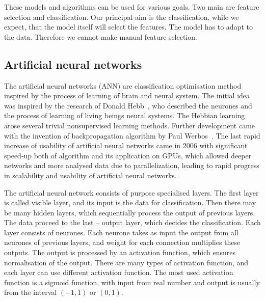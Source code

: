 \documentclass[
  print, %
  Table,   %
  nolof,     %
  nolot,     %
  11pt, %
  oneside  %
]{fithesis3}
\begin{document}
These models and algorithms can be used for various goals. Two main are feature selection and classification. Our principal aim is the classification, while we expect, that the model itself will select the features. The model has to adapt to the data. Therefore we cannot make manual feature selection.


\subsection{Artificial neural networks}
\label{subsec:opt-other-ann}


The artificial neural networks (ANN) are classification optimisation method inspired by the process of learning of brain and neural system. The initial idea was inspired by the research of Donald Hebb~\cite{hebb49learning}, who described the neurones and the process of learning of living beings neural systems. The Hebbian learning arose several trivial nonsupervised learning methods. Further development came with the invention of backpropagation algorithm by Paul Werbos~\cite{werbos75beyondThesis}. The last rapid increase of usability of artificial neural networks came in 2006 with significant speed-up both of algorithm and its application on GPUs, which allowed deeper networks and more analysed data due to parallelization, leading to rapid progress in scalability and usability of artificial neural networks.

The artificial neural network consists of purpose specialised layers. The first layer is called visible layer, and its input is the data for classification. Then there may be many hidden layers, which sequentially process the output of previous layers. The data proceed to the last -- output layer, which decides the classification. Each layer consists of neurones. Each neurone takes as input the output from all neurones of previous layers, and weight for each connection multiplies these outputs. The output is processed by an activation function, which ensures normalisation of the output. There are many types of activation function, and each layer can use different activation function. The most used activation function is a sigmoid function, with input from real number and output is usually from the interval $(-1, 1)$ or $(0, 1)$.
\end{document}
